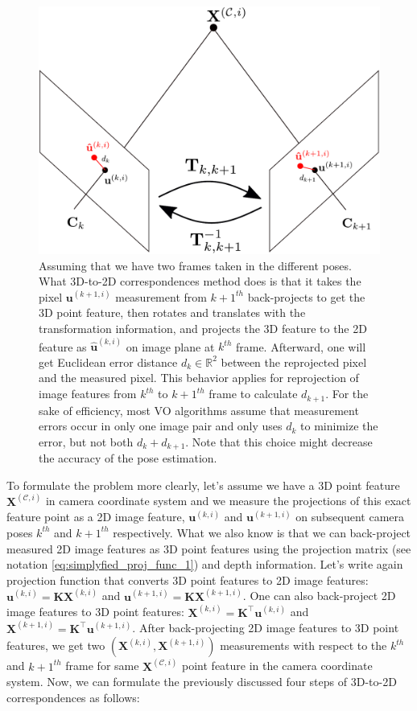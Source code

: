 \documentclass[12pt]{report}
\numberwithin{figure}{section}
\newcommand{\R}{\mathbb{R}}
\begin{document}
\begin{figure}[H]
	\centering
  \includegraphics[width=0.8\linewidth,natwidth=640,natheight=640]
  {fig/drawings/3d_to_2d.pdf}
  \caption[3D-to-2D Correspondences]{Assuming that we have two frames taken in 
  the different poses. What 3D-to-2D correspondences method does is that it 
  takes the pixel $\mathbf{u}^{(k+1,i)}$ measurement from $k+1^{th}$ 
  back-projects to get the 3D point feature, then rotates and translates with 
  the transformation information, and projects the 3D feature to the 2D 
  feature as $\mathbf{\hat{u}}^{(k,i)}$ on image plane at $k^{th}$ frame. 
  Afterward, one will get Euclidean error distance $d_k \in \R^2$ between the 
  reprojected pixel and the measured pixel. This behavior applies for 
  reprojection of image features from $k^{th}$ to $k+1^{th}$ frame to 
  calculate $d_{k+1}$. 
  For the sake of efficiency, most VO algorithms assume that measurement 
  errors occur in only one image pair and only uses $d_k$ to minimize the 
  error, but not both $d_k+d_{k+1}$. Note that 
  this choice might decrease the accuracy of the 
  pose estimation.}
	\label{fig:min_geometric_error}
\end{figure}


To formulate the problem more clearly, let's assume we have a 3D point feature 
$\mathbf{X}^{(\mathcal{C}, i)}$ in camera coordinate system and 
we measure 
the projections of this exact feature point as a 2D image feature, 
$\mathbf{u}^{(k,i)}$ and $\mathbf{u}^{(k+1,i)}$ on subsequent 
camera poses $k^{th}$ and $k+1^{th}$ respectively. What we also know is that 
we can back-project measured 2D image features as 3D point features using 
the projection matrix (see notation \eqref{eq:simplyfied_proj_func_1}) and 
depth 
information. Let's write again projection function that converts 3D point 
features to 2D image features: $\mathbf{u}^{(k,i)} = 
\mathbf{K}\mathbf{X}^{(k,i)}$ and $\mathbf{u}^{(k+1,i)} = 
\mathbf{K}\mathbf{X}^{(k+1,i)}$.
One can also back-project 2D image features to 3D point features: 
$\mathbf{X}^{(k,i)} = \mathbf{K}^\top \mathbf{u}^{(k,i)}$ and 
$\mathbf{X}^{(k+1,i)} = \mathbf{K}^\top \mathbf{u}^{(k+1,i)}$. 
After back-projecting 2D image features to 3D point features, 
we get two 
$(\mathbf{X}^{(k,i)},\mathbf{X}^{(k+1,i)})$ measurements with respect to the 
$k^{th}$
and $k+1^{th}$ frame for  
same $\mathbf{X}^{(\mathcal{C}, i)}$ point feature in the camera coordinate 
system. 
Now, we can formulate the 
previously discussed four steps of 3D-to-2D correspondences as follows:
\end{document}
